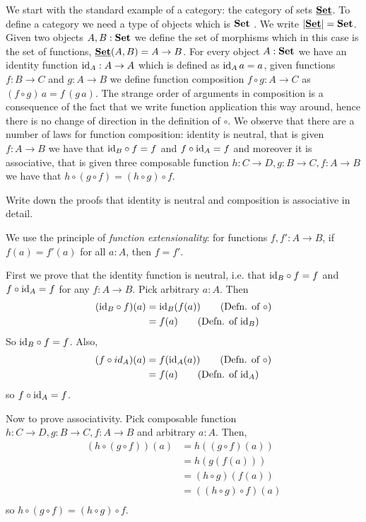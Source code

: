 We start with the standard example of a category: the category of sets $\underline{\mathbf{\mathbf{Set}}}$. To define a category we need a type of objects which is $\mathbf{Set}$
. We write $|\underline{\mathbf{\mathbf{Set}}}| = \mathbf{Set}$. 
Given two objects $A,B : \mathbf{Set}$ we define the set of morphisms which in this case is the set of functions, $\underline{\mathbf{\mathbf{Set}}}(A,B) = A \to B$. For every object $A : \mathbf{Set}$ we have an identity function $\mathrm{id}_A : A \to A$ which is defined as $\mathrm{id}_A\,a = a$, given functions $f : B \to C$ and $g : A \to B$ we define function composition $f \circ g : A \to C$ as $(f\circ g)\,a = f\,(g\,a)$. The strange order of arguments in composition is a consequence of the fact that we write function application this way around, hence there is no change of direction in the definition of $\circ$. We observe that there are a number of laws for function composition: identity is neutral, that is given $f : A \to B$ we have that $\mathrm{id}_B \circ f = f$ and $f \circ \mathrm{id}_A = f$ and moreover it is associative, that is given three composable function $h : C \to D, g : B \to C, f : A \to B$ we have that $h \circ (g \circ f) = (h \circ g) \circ f$.

\begin{Exercise}
  Write down the proofs that identity is neutral and composition is associative in detail.
\end{Exercise}
\begin{Answer}
  We use the principle of \emph{function extensionality}: for functions $f,f':A\to B$, if $f(a)=f'(a)$ for all $a:A$, then $f=f'$.

  First we prove that the identity function is neutral, i.e. that $\mathrm{id}_B\circ f=f$ and $f\circ\mathrm{id}_A=f$ for any $f\colon A\to B$. Pick arbitrary $a:A$. Then
  \begin{align*}
    (\id_B \circ f)(a) 
      &= \id_B(f(a)) \tag{Defn. of $\circ$}\\
      &= f(a) \tag{Defn. of $\id_B$} 
  \end{align*}
  So $\mathrm{id}_B\circ f = f$. Also,
  \begin{align*}
    (f\circ id_A)(a) 
      &= f(\id_A(a)) \tag{Defn. of $\circ$}\\
      &= f(a) \tag{Defn. of $\id_A$} 
  \end{align*}
  so $f\circ\mathrm{id}_A = f$.

  Now to prove associativity. Pick composable function $h : C \to D, g : B \to C, f : A \to B$ and arbitrary $a:A$. Then,
  \begin{align*}
    (h \circ (g \circ f))(a)
      &= h((g\circ f)(a)) \tag{Defn. $\circ$}\\
      &= h(g(f(a))) \tag{Defn. $\circ$}\\
      &= (h\circ g)(f(a)) \tag{Defn. $\circ$}\\
      &= ((h\circ g)\circ f)(a) \tag{Defn. $\circ$}\\
  \end{align*}
  so $h \circ (g \circ f) = (h \circ g) \circ f$.
\end{Answer}

